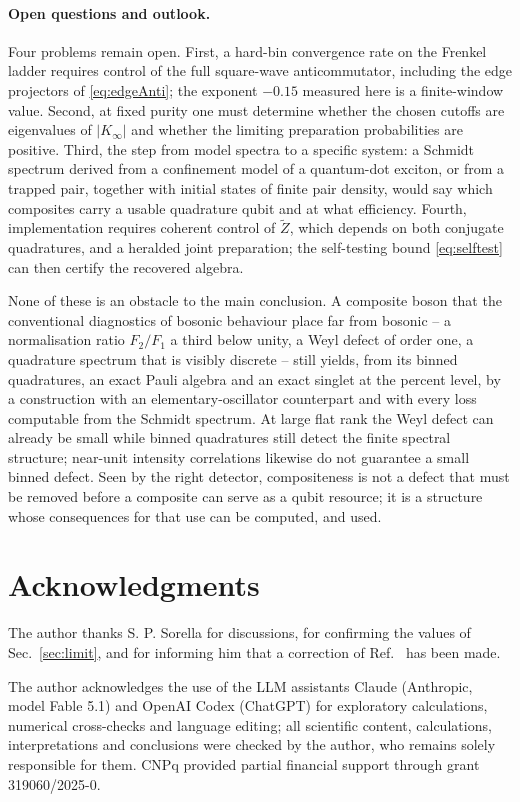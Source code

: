\documentclass[11pt,a4paper]{article}
\newcommand{\Zt}{\widetilde Z}
\begin{document}
\paragraph{Open questions and outlook.}
Four problems remain open. First, a hard-bin convergence rate on the Frenkel ladder requires control of the full square-wave anticommutator, including the edge projectors of \eqref{eq:edgeAnti}; the exponent $-0.15$ measured here is a finite-window value. Second, at fixed purity one must determine whether the chosen cutoffs are eigenvalues of $|K_\infty|$ and whether the limiting preparation probabilities are positive. Third, the step from model spectra to a specific system: a Schmidt spectrum derived from a confinement model of a quantum-dot exciton, or from a trapped pair, together with initial states of finite pair density, would say which composites carry a usable quadrature qubit and at what efficiency. Fourth, implementation requires coherent control of $\Zt$, which depends on both conjugate quadratures, and a heralded joint preparation; the self-testing bound \eqref{eq:selftest} can then certify the recovered algebra.

None of these is an obstacle to the main conclusion. A composite boson that the conventional diagnostics of bosonic behaviour place far from bosonic -- a normalisation ratio $F_2/F_1$ a third below unity, a Weyl defect of order one, a quadrature spectrum that is visibly discrete -- still yields, from its binned quadratures, an exact Pauli algebra and an exact singlet at the percent level, by a construction with an elementary-oscillator counterpart and with every loss computable from the Schmidt spectrum. At large flat rank the Weyl defect can already be small while binned quadratures still detect the finite spectral structure; near-unit intensity correlations likewise do not guarantee a small binned defect. Seen by the right detector, compositeness is not a defect that must be removed before a composite can serve as a qubit resource; it is a structure whose consequences for that use can be computed, and used.

\section*{Acknowledgments}
The author thanks S. P. Sorella for discussions, for confirming the values of Sec.~\ref{sec:limit}, and for informing him that a correction of Ref.~\cite{Sorella2026} has been made.

The author acknowledges the use of the LLM assistants Claude (Anthropic, model Fable 5.1) and OpenAI Codex (ChatGPT) for exploratory calculations, numerical cross-checks and language editing; all scientific content, calculations, interpretations and conclusions were checked by the author, who remains solely responsible for them. CNPq provided partial financial support through grant \mbox{319060/2025-0}.
\end{document}
